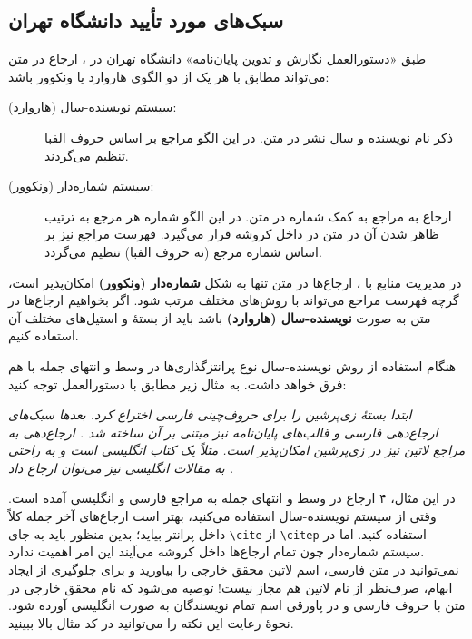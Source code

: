 \subsection{سبک‌های مورد تأیید دانشگاه تهران}
طبق «دستورالعمل نگارش و تدوین پایان‌نامه» دانشگاه تهران در
\cite{UTThesisGuide}،
ارجاع در متن می‌تواند مطابق با هر یک از دو الگوی هاروارد یا ونکوور باشد:
\singlespacing
\begin{description}
	\item[سیستم نویسنده-سال (هاروارد):]
	      ذکر نام نویسنده و سال نشر در متن. در این الگو مراجع بر اساس حروف الفبا تنظیم می‌گردند.
	\item[سیستم شماره‌دار (ونکوور):]
	      ارجاع به مراجع به کمک شماره در متن. در این الگو شماره هر مرجع به ترتیب ظاهر شدن آن در متن در داخل کروشه قرار می‌گیرد. فهرست مراجع نیز بر اساس شماره مرجع (نه حروف الفبا) تنظیم می‌گردد.
\end{description}
\doublespacing

در مدیریت منابع با
،
ارجاع‌ها در متن تنها به شکل
\textbf{شماره‌دار (ونکوور)}
امکان‌پذیر است، گرچه فهرست مراجع می‌تواند با روش‌های مختلف مرتب شود. اگر بخواهیم ارجاع‌ها در متن به صورت
\textbf{نویسنده-سال (هاروارد)}
باشد باید از بستهٔ
و استیل‌های مختلف آن استفاده کنیم.

هنگام استفاده از روش نویسنده-سال نوع پرانتزگذاری‌ها در وسط و انتهای جمله با هم فرق خواهد داشت. به مثال زیر مطابق با دستورالعمل
\cite{UTThesisGuide}
توجه کنید:

\textit{
	ابتدا
	\cite{Khalighi87xepersian}
	بستهٔ زی‌پرشین را برای حروف‌چینی فارسی اختراع کرد. بعدها سبک‌های ارجاع‌دهی فارسی و قالب‌های پایان‌نامه نیز مبتنی بر آن ساخته شد
	\citep{persianbib87userguide}.
	ارجاع‌دهی به مراجع لاتین نیز در زی‌پرشین امکان‌پذیر است. مثلاً
	یک کتاب انگلیسی است و به راحتی به مقالات انگلیسی نیز می‌توان ارجاع داد
	.}

در این مثال، ۴ ارجاع در وسط و انتهای جمله به مراجع فارسی و انگلیسی آمده است. وقتی از سیستم نویسنده-سال استفاده می‌کنید، بهتر است ارجاع‌های آخر جمله کلاً داخل پرانتر بیاید؛ بدین منظور باید به جای
\verb|\cite|
از
\verb|\citep|
استفاده کنید. اما در سیستم شماره‌دار چون تمام ارجاع‌ها داخل کروشه می‌آیند این امر اهمیت ندارد.\\
نمی‌توانید در متن فارسی، اسم لاتین محقق خارجی را بیاورید و برای جلوگیری از ایجاد ابهام، صرف‌نظر از نام لاتین هم مجاز نیست! توصیه می‌شود که نام محقق خارجی در متن با حروف فارسی و در پاورقی اسم تمام نویسندگان به صورت انگلیسی آورده شود. نحوهٔ رعایت این نکته را می‌توانید در کد مثال بالا ببینید.

